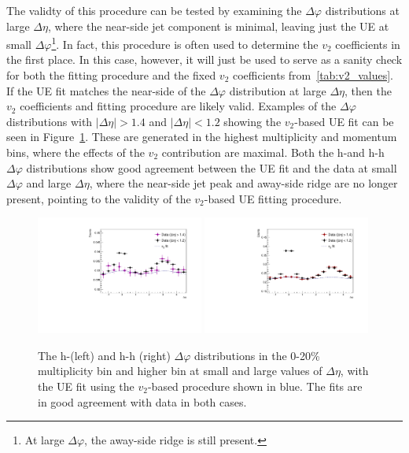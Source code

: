 The validty of this procedure can be tested by examining the $\Delta\varphi$ distributions at large $\Delta\eta$, where the near-side jet component is minimal, leaving just the UE at small $\Delta\varphi$\footnote{At large $\Delta\varphi$, the away-side ridge is still present.}. In fact, this procedure is often used to determine the $v_{2}$ coefficients in the first place. In this case, however, it will just be used to serve as a sanity check for both the fitting procedure and the fixed $v_{2}$ coefficients from~\ref{tab:v2_values}. If the UE fit matches the near-side of the $\Delta\varphi$ distribution at large $\Delta\eta$, then the $v_{2}$ coefficients and fitting procedure are likely valid. Examples of the $\Delta\varphi$ distributions with $|\Delta\eta| > 1.4$ and $|\Delta\eta| < 1.2$ showing the $v_{2}$-based UE fit can be seen in Figure~\ref{fig:v2_fit_large_deta}. These are generated in the highest multiplicity and momentum bins, where the effects of the $v_{2}$ contribution are maximal. Both the h-\lmb and h-h $\Delta\varphi$ distributions show good agreement between the UE fit and the data at small $\Delta\varphi$ and large $\Delta\eta$, where the near-side jet peak and away-side ridge are no longer present, pointing to the validity of the $v_{2}$-based UE fitting procedure.

\begin{figure}[ht]
    \centering
    \includegraphics[width=0.49\textwidth]{figures/analysis/v2fit_largedeta_h_lambda_cent_0_20_trigger_4_8_assoc_25_4.pdf}
    \includegraphics[width=0.49\textwidth]{figures/analysis/v2fit_largedeta_h_h_cent_0_20_trigger_4_8_assoc_25_4.pdf}
    \caption{The h-\lmb (left) and h-h (right) $\Delta\varphi$ distributions in the 0-20\% multiplicity bin and higher \pt bin at small and large values of $\Delta\eta$, with the UE fit using the $v_{2}$-based procedure shown in blue. The fits are in good agreement with data in both cases.}
    \label{fig:v2_fit_large_deta}
\end{figure}

